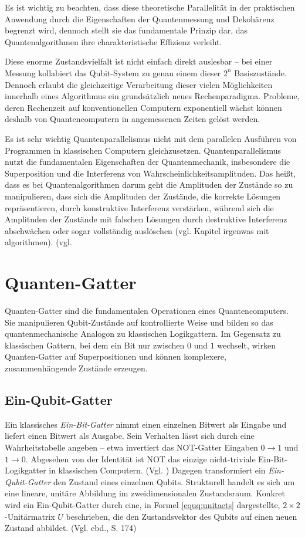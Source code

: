 Es ist wichtig zu beachten, dass diese theoretische Parallelität in der praktischen Anwendung durch die Eigenschaften der Quantenmessung und Dekohärenz begrenzt wird, dennoch stellt sie das fundamentale Prinzip dar, das Quantenalgorithmen ihre charakteristische Effizienz verleiht.

Diese enorme Zustandsvielfalt ist nicht einfach direkt auslesbar – bei einer Messung kollabiert das Qubit-System zu genau einem dieser \(2^n\) Basiszustände. Dennoch erlaubt die gleichzeitige Verarbeitung dieser vielen Möglichkeiten innerhalb eines Algorithmus ein grundsätzlich neues Rechenparadigma. Probleme, deren Rechenzeit auf konventionellen Computern exponentiell wächst können deshalb von Quantencomputern in angemessenen Zeiten gelöst werden. 

Es ist sehr wichtig Quantenparallelismus nicht mit dem parallelen Ausführen von Programmen in klassischen Computern gleichzusetzen. Quantenparallelismus nutzt die fundamentalen Eigenschaften der Quantenmechanik, insbesondere die Superposition und die Interferenz von Wahrscheinlichkeitsamplituden. Das heißt, dass es bei Quantenalgorithmen darum geht die Amplituden der Zustände so zu manipulieren, dass sich die Amplituden der Zustände, die korrekte Lösungen repräsentieren, durch konstruktive Interferenz verstärken, während sich die Amplituden der Zustände mit falschen Lösungen durch destruktive Interferenz abschwächen oder sogar vollständig auslöschen (vgl. Kapitel irgenwas mit algorithmen). (vgl. \cite[16 f.]{nielsen_quantum_2010}
\\
\section{Quanten-Gatter}\label{sec:quanten_gatter}
Quanten-Gatter sind die fundamentalen Operationen eines Quantencomputers. Sie manipulieren Qubit-Zustände auf kontrollierte Weise und bilden so das quantenmechanische Analogon zu klassischen Logikgattern. Im Gegensatz zu klassischen Gattern, bei dem ein Bit nur zwischen $0$ und $1$ wechselt, wirken Quanten-Gatter auf Superpositionen und können komplexere, zusammenhängende Zustände erzeugen.
\\
\subsection{Ein-Qubit-Gatter}
Ein klassisches \emph{Ein-Bit-Gatter} nimmt einen einzelnen Bitwert als Eingabe und liefert einen Bitwert als Ausgabe. Sein Verhalten lässt sich durch eine Wahrheitstabelle angeben – etwa invertiert das NOT-Gatter Eingaben $0 \rightarrow 1$ und $1 \rightarrow 0$. Abgesehen von der Identität ist NOT das einzige nicht-triviale Ein-Bit-Logikgatter in klassischen Computern. (Vgl. \cite[S.17f.]{nielsen_quantum_2010}) Dagegen transformiert ein \emph{Ein-Qubit-Gatter} den Zustand eines einzelnen Qubits. Strukturell handelt es sich um eine lineare, unitäre Abbildung im zweidimensionalen Zustandsraum. Konkret wird ein Ein-Qubit-Gatter durch eine, in Formel \ref{equq:unitaets} dargestellte, $2\times 2$-Unitärmatrix $U$ beschrieben, die den Zustandsvektor des Qubits auf einen neuen Zustand abbildet. (Vgl. ebd., S. 174)

